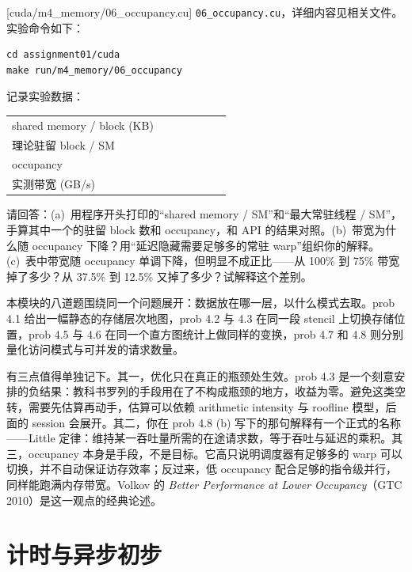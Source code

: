 \documentclass[11pt,a4paper,fontset=none]{ctexart}
\begin{document}
[cuda/m4\_memory/06\_occupancy.cu]
\texttt{06\_occupancy.cu}，详细内容见相关文件。实验命令如下：

\begin{lstlisting}
cd assignment01/cuda
make run/m4_memory/06_occupancy
\end{lstlisting}

记录实验数据：

\begin{center}\small
\begin{tabular}{@{}lcccccc@{}}
\toprule
shared memory / block (KB) & & & & & & \\
理论驻留 block / SM & & & & & & \\
occupancy & & & & & & \\
实测带宽 (GB/s) & & & & & & \\
\bottomrule
\end{tabular}
\end{center}

请回答：(a)~用程序开头打印的“shared memory / SM”和“最大常驻线程 / SM”，手算其中一个的驻留 block 数和 occupancy，和 API 的结果对照。(b)~带宽为什么随 occupancy 下降？用“延迟隐藏需要足够多的常驻 warp”组织你的解释。(c)~表中带宽随 occupancy 单调下降，但明显不成正比——从 100\% 到 75\% 带宽掉了多少？从 37.5\% 到 12.5\% 又掉了多少？试解释这个差别。

\begin{lookback}
本模块的八道题围绕同一个问题展开：数据放在哪一层，以什么模式去取。prob 4.1 给出一幅静态的存储层次地图，prob 4.2 与 4.3 在同一段 stencil 上切换存储位置，prob 4.5 与 4.6 在同一个直方图统计上做同样的变换，prob 4.7 和 4.8 则分别量化访问模式与可并发的请求数量。

有三点值得单独记下。其一，优化只在真正的瓶颈处生效。prob 4.3 是一个刻意安排的负结果：教科书罗列的手段用在了不构成瓶颈的地方，收益为零。避免这类空转，需要先估算再动手，估算可以依赖 arithmetic intensity 与 roofline 模型，后面的 session 会展开。其二，你在 prob 4.8 (b) 写下的那句解释有一个正式的名称——Little 定律：维持某一吞吐量所需的在途请求数，等于吞吐与延迟的乘积。其三，occupancy 本身是手段，不是目标。它高只说明调度器有足够多的 warp 可以切换，并不自动保证访存效率；反过来，低 occupancy 配合足够的指令级并行，同样能跑满内存带宽。Volkov 的 \textit{Better Performance at Lower Occupancy}（GTC 2010）是这一观点的经典论述。
\end{lookback}

\section{计时与异步初步}
\end{document}
